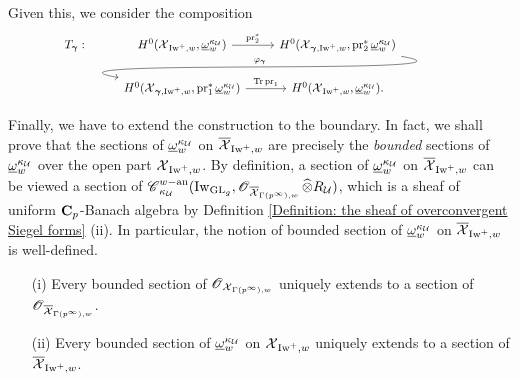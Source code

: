 Given this, we consider the composition 
$$
    \begin{tikzcd}
    T_{\bfgamma}: & H^0(\calX_{\Iw^+, w}, \underline{\omega}_w^{\kappa_{\calU}})\arrow[r, "\pr_2^*"] & H^0(\calX_{\bfgamma, \Iw^+, w}, \pr_2^*\underline{\omega}_w^{\kappa_{\calU}}) \arrow[ld, out=-10, in=170, "\varphi_{\bfgamma}"']\\
    & H^0(\calX_{\bfgamma, \Iw^+, w}, \pr_1^*\underline{\omega}_w^{\kappa_{\calU}}) \arrow[r, "\Tr\pr_1"] & H^0(\calX_{\Iw^+, w}, \underline{\omega}_w^{\kappa_{\calU}}). \end{tikzcd}
$$

Finally, we have to extend the construction to the boundary. In fact, we shall prove that the sections of $\underline{\omega}^{\kappa_{\operatorname{\mathcal{U}}}}_w$ on $\overline{\operatorname{\mathcal{X}}}_{\operatorname{Iw}^+,w}$ are precisely the \emph{bounded} sections of $\underline{\omega}^{\kappa_{\operatorname{\mathcal{U}}}}_w$ over the open part $\operatorname{\mathcal{X}}_{\operatorname{Iw}^+,w}$. By definition, a section of $\underline{\omega}^{\kappa_{\operatorname{\mathcal{U}}}}_w$ on $\overline{\operatorname{\mathcal{X}}}_{\operatorname{Iw}^+,w}$ can be viewed a section of $\operatorname{\mathscr{C}}^{w-\operatorname{an}}_{\kappa_{\operatorname{\mathcal{U}}}}(\operatorname{Iw}_{\operatorname{GL}_g}, \operatorname{\mathscr{O}}_{\overline{\operatorname{\mathcal{X}}}_{\Gamma(p^{\infty}),w}}\widehat{\otimes}R_{\operatorname{\mathcal{U}}})$, which is a sheaf of uniform $\operatorname{\mathbf{C}}_p$-Banach algebra by Definition \ref{Definition: the sheaf of overconvergent Siegel forms} (ii). In particular, the notion of bounded section of $\underline{\omega}^{\kappa_{\operatorname{\mathcal{U}}}}_w$ on $\overline{\operatorname{\mathcal{X}}}_{\operatorname{Iw}^+,w}$ is well-defined.

\begin{Lemma}\label{Lemma: extend to the boundary}
\begin{enumerate}
\item[(i)] Every bounded section of $\operatorname{\mathscr{O}}_{\operatorname{\mathcal{X}}_{\Gamma(p^{\infty}),w}}$ uniquely extends to a section of $\operatorname{\mathscr{O}}_{\overline{\operatorname{\mathcal{X}}}_{\Gamma(p^{\infty}),w}}$.
\item[(ii)] Every bounded section of $\underline{\omega}^{\kappa_{\operatorname{\mathcal{U}}}}_w$ on $\operatorname{\mathcal{X}}_{\operatorname{Iw}^+,w}$ uniquely extends to a section of $\overline{\operatorname{\mathcal{X}}}_{\operatorname{Iw}^+,w}$. 
\end{enumerate}
\end{Lemma}

